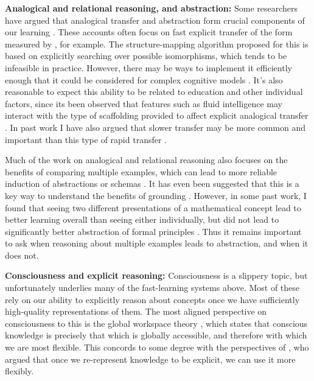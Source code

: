 \documentclass[11pt]{article}
\begin{document}
\textbf{Analogical and relational reasoning, and abstraction:} Some researchers have argued that analogical transfer and abstraction form crucial components of our learning \citep[e.g.]{Gentner2003, Gentner2017}. These accounts often focus on fast explicit transfer of the form measured by \citet{Gick1980}, for example. The structure-mapping algorithm \citep{Falkenhainer1989} proposed for this is based on explicitly searching over possible isomorphisms, which tends to be infeasible in practice. However, there may be ways to implement it efficiently enough that it could be considered for complex cognitive models \citep{Forbus2017}. It's also reasonable to expect this ability to be related to education and other individual factors, since its been observed that features such as fluid intelligence may interact with the type of scaffolding provided to affect explicit analogical transfer \citep{Kubricht2017}. In past work I have also argued that slower transfer may be more common and important than this type of rapid transfer \citep{Lampinen2017a}. \par
Much of the work on analogical and relational reasoning also focuses on the benefits of comparing multiple examples, which can lead to more reliable induction of abstractions or schemas \citep{Gick1980, Gentner2017}. It has even been suggested that this is a key way to understand the benefits of grounding \citep{Jamrozik2016}. However, in some past work, I found that seeing two different presentations of a mathematical concept lead to better learning overall than seeing either individually, but did not lead to significantly better abstraction of formal principles \citep{Lampinen2017b}. Thus it remains important to ask when reasoning about multiple examples leads to abstraction, and when it does not. \par 
\textbf{Consciousness and explicit reasoning:} Consciousness is a slippery topic, but unfortunately underlies many of the fast-learning systems above. Most of these rely on our ability to explicitly reason about concepts once we have sufficiently high-quality representations of them. The most aligned perspective on consciousness to this is the global workspace theory \citep{Baars2005, Dehaene2017}, which states that conscious knowledge is precisely that which is globally accessible, and therefore with which we are most flexible. This concords to some degree with the perspectives of \citet{Karmiloff-Smith1986}, who argued that once we re-represent knowledge to be explicit, we can use it more flexibly. \par
\end{document}
